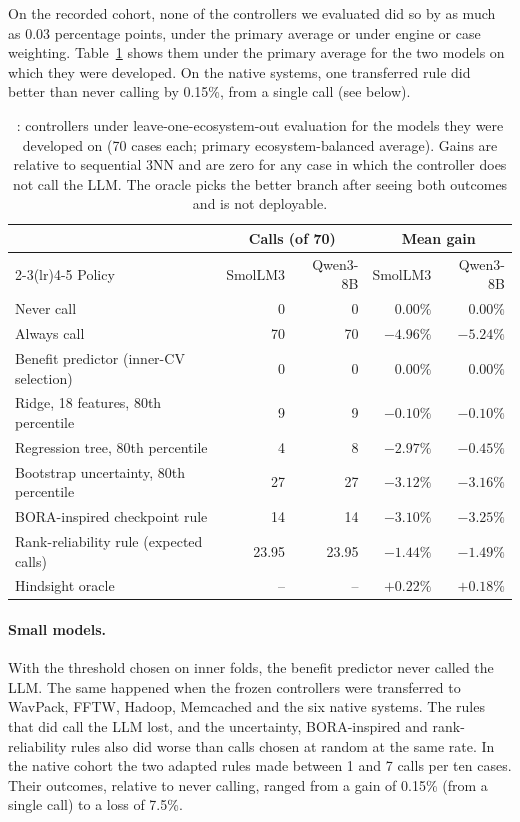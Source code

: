 On the recorded cohort, none of the controllers we evaluated did so by as much as 0.03 percentage points, under the primary average or under engine or case weighting. Table~\ref{tab:rq4} shows them under the primary average for the two models on which they were developed. On the native systems, one transferred rule did better than never calling by 0.15\%, from a single call (see below).

\begin{table}[t]
\centering
\caption{: controllers under leave-one-ecosystem-out evaluation for the models they were developed on (70 cases each; primary ecosystem-balanced average). Gains are relative to sequential 3NN and are zero for any case in which the controller does not call the LLM. The oracle picks the better branch after seeing both outcomes and is not deployable.}
\label{tab:rq4}
\small
\begin{tabular}{lrrrr}
\toprule
 & \multicolumn{2}{c}{Calls (of 70)} & \multicolumn{2}{c}{Mean gain} \\
\cmidrule(lr){2-3}\cmidrule(lr){4-5}
Policy & SmolLM3 & Qwen3-8B & SmolLM3 & Qwen3-8B \\
\midrule
Never call & 0 & 0 & $0.00\%$ & $0.00\%$ \\
Always call & 70 & 70 & $-4.96\%$ & $-5.24\%$ \\
Benefit predictor (inner-CV selection) & 0 & 0 & $0.00\%$ & $0.00\%$ \\
Ridge, 18 features, 80th percentile & 9 & 9 & $-0.10\%$ & $-0.10\%$ \\
Regression tree, 80th percentile & 4 & 8 & $-2.97\%$ & $-0.45\%$ \\
Bootstrap uncertainty, 80th percentile & 27 & 27 & $-3.12\%$ & $-3.16\%$ \\
BORA-inspired checkpoint rule & 14 & 14 & $-3.10\%$ & $-3.25\%$ \\
Rank-reliability rule (expected calls) & 23.95 & 23.95 & $-1.44\%$ & $-1.49\%$ \\
\midrule
Hindsight oracle & -- & -- & $+0.22\%$ & $+0.18\%$ \\
\bottomrule
\end{tabular}
\end{table}

\paragraph{Small models.} With the threshold chosen on inner folds, the benefit predictor never called the LLM. The same happened when the frozen controllers were transferred to WavPack, FFTW, Hadoop, Memcached and the six native systems. The rules that did call the LLM lost, and the uncertainty, BORA-inspired and rank-reliability rules also did worse than calls chosen at random at the same rate. In the native cohort the two adapted rules made between 1 and 7 calls per ten cases. Their outcomes, relative to never calling, ranged from a gain of 0.15\% (from a single call) to a loss of 7.5\%.


